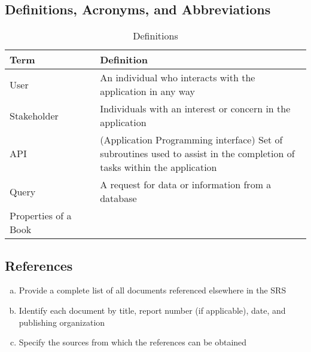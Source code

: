 \documentclass[12pt, titlepage, a4paper]{article}
\begin{document}
\subsection{Definitions, Acronyms, and Abbreviations}
\label{sub:definitions_acronyms_and_abbreviations}
\begin{table}[H]
    \begin{center}
        \begin{tabular}{| p{0.30\linewidth} | p{0.70\linewidth} |}
            \hline
            \textbf{Term} & \textbf{Definition}\\
            \hline
            User & An individual who interacts with the application in any way \\
            Stakeholder & Individuals with an interest or concern in the application \\
            API & (Application Programming interface) Set of subroutines used to assist in the completion of tasks within the application\\
            Query & A request for data or information from a database \\
            Properties of a Book & \\
            \hline
        \end{tabular}
        \caption{Definitions} \label{tab:Defs}
    \end{center}
\end{table}

\subsection{References}
\label{sub:references}
\begin{enumerate}[a)]
	\item Provide a complete list of all documents referenced elsewhere in the SRS
	\item Identify each document by title, report number (if applicable), date, and publishing organization
	\item Specify the sources from which the references can be obtained
\end{enumerate}
\end{document}
